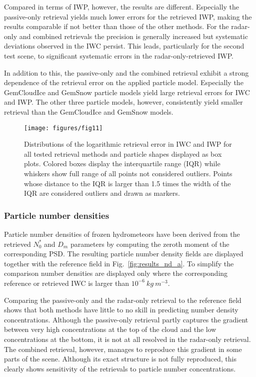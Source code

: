 \documentclass[journal abbreviation, manuscript]{copernicus}
\begin{document}
Compared in terms of IWP, however, the results are different. Especially the
passive-only retrieval yields much lower errors for the retrieved IWP, making
the results comparable if not better than those of the other methods. For the
radar-only and combined retrievals the precision is generally increased but
systematic deviations observed in the IWC persist. This leads, particularly for
the second test scene, to significant systematic errors in the
radar-only-retrieved IWP.

In addition to this, the passive-only and the combined retrieval exhibit a
strong dependence of the retrieval error on the applied particle model.
Especially the GemCloudIce and GemSnow particle models yield large retrieval
errors for IWC and IWP. The other three particle models, however, consistently
yield smaller retrieval than the GemCloudIce and GemSnow models.


\begin{figure}[!h]
\centering
\texttt{[image: figures/fig11]}
\caption{Distributions of the logarithmic retrieval error in IWC and IWP for all tested retrieval
  methods and particle shapes displayed as box plots. Colored boxes display the interquartile range (IQR)
  while whiskers show full range of all points not considered outliers. Points whose distance to
  the IQR is larger than 1.5 times the width of the IQR are considered outliers and drawn as markers.}
\label{fig:boxes}
\end{figure}

\subsubsection{Particle number densities}

Particle number densities of frozen hydrometeors have been derived from the
retrieved $N_0^*$ and $D_m$ parameters by computing the zeroth moment of the
corresponding PSD. The resulting particle number density fields are displayed
together with the reference field in Fig.~\ref{fig:results_nd_a}. To simplify
the comparison number densities are displayed only where the corresponding
reference or retrieved IWC is larger than $10^{-6}\ \unit{kg\ m^{-3}}$.

Comparing the passive-only and the radar-only retrieval to the reference field
shows that both methods have little to no skill in predicting number density
concentrations. Although the passive-only retrieval partly captures the
gradient between very high concentrations at the top of the cloud and the low
concentrations at the bottom, it is not at all resolved in the radar-only
retrieval. The combined retrieval, however, manages to reproduce this gradient
in some parts of the scene. Although its exact structure is not fully
reproduced, this clearly shows sensitivity of the retrievals to particle number
concentrations.
\end{document}

